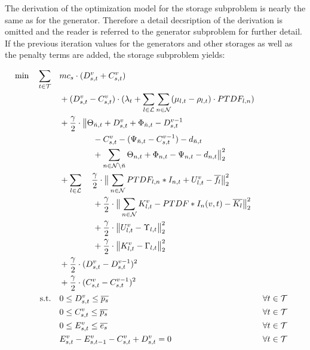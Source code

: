 The derivation of the optimization model for the storage subproblem is nearly the same as for the generator. Therefore a detail decsription of the derivation is omitted and the reader is referred to the generator subproblem for further detail. If the previous iteration values for the generators and other storages as well as the penalty terms are added, the storage subproblem yields:

 \begin{subequations}
	\begin{align}
		 \min \quad \sum_{t\in\mathcal{T}} \quad & mc_s \cdot (D_{s,t}^v + C_{s,t}^v)\label{eq:sub:stor}\\
		 & + (D_{s,t}^v - C_{s,t}^v) \cdot (\lambda_t + \sum_{l \in \mathcal{L}} \sum_{n \in \mathcal{N}} (\mu_{l,t} - \rho_{l,t}) \cdot PTDF_{l,n}) \nonumber \\ 
		 & + \frac{\gamma}{2} \cdot \big\| \Theta_{\breve{n},t} + D_{s,t}^v + \Phi_{\breve{n},t} - D_{s,t}^{v-1} \nonumber \\
		 & \qquad \qquad - C_{s,t}^v - (\Psi_{\breve{n},t} - C_{s,t}^{v-1}) - d_{\breve{n},t} \nonumber \\
		 & \qquad \qquad + \sum_{n \in \mathcal{N} \setminus \breve{n}} \Theta_{n,t} + \Phi_{n,t} - \Psi_{n,t} - d_{n,t} \big\|^2_2 \nonumber \\
		 & + \sum_{l \in \mathcal{L}} \quad \frac{\gamma}{2} \cdot \big\| \sum_{n \in \mathcal{N}} PTDF_{l,n} * I_{n,t} + U_{l,t}^v - \overline{f_l}\big\|^2_2 \nonumber \\
		 & \qquad \qquad + \frac{\gamma}{2} \cdot \big\| \sum_{n \in \mathcal{N}} K_{l,t}^v - PTDF * I_n(v, t) - \overline{K_l}\big\|^2_2\nonumber \\
		 & \qquad \qquad + \frac{\gamma}{2} \cdot \big\|U_{l,t}^v - \Upsilon_{l,t}  \big\|^2_2 \nonumber\\
		 & \qquad \qquad + \frac{\gamma}{2} \cdot \big\|K_{l,t}^v - \Gamma_{l,t}  \big\|^2_2 \nonumber \\
		 & + \frac{\gamma}{2} \cdot (D_{s,t}^v - D_{s,t}^{v-1} )^2 \nonumber \\
		 & + \frac{\gamma}{2} \cdot (C_{s,t}^v - C_{s,t}^{v-1} )^2 \nonumber \\
		 \text{s.t.} \quad & 0 \leq D_{s,t}^v \leq \overline{p_s} && \forall t \in \mathcal{T} \\
		 & 0 \leq C_{s,t}^v \leq \overline{p_s} && \forall t \in \mathcal{T}\\
		 & 0 \leq E_{s,t}^v \leq \overline{e_s} && \forall t \in \mathcal{T}\\
		 & E_{s,t}^v - E_{s,t-1}^v - C_{s,t}^v + D_{s,t}^v = 0 && \forall t \in \mathcal{T}
	\end{align}
\end{subequations}


